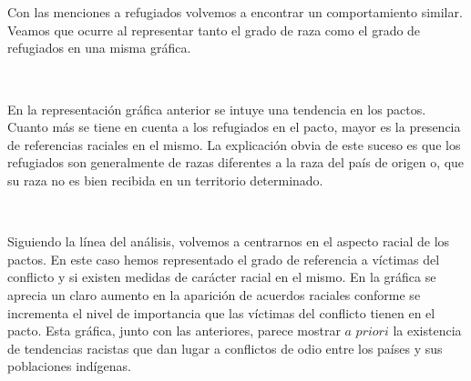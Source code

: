 \documentclass[11pt]{article}
\begin{document}
    \begin{center}
    \end{center}
    { \hspace*{\fill} \\}
    
    \begin{center}
    \end{center}
    { \hspace*{\fill} \\}
    
    Con las menciones a refugiados volvemos a encontrar un comportamiento similar. Veamos que ocurre al representar tanto el grado de raza como el grado de refugiados en una misma gráfica.
        
    \begin{center}
    \end{center}
    { \hspace*{\fill} \\}
    
    En la representación gráfica anterior se intuye una tendencia en los pactos. Cuanto más se tiene en cuenta a los refugiados en el pacto, mayor es la presencia de referencias raciales en el mismo. La explicación obvia de este suceso es que los refugiados son generalmente de razas diferentes a la raza del país de origen o, que su raza no es bien recibida en un territorio determinado.
    
    \begin{center}
    \end{center}
    { \hspace*{\fill} \\}
    
    Siguiendo la línea del análisis, volvemos a centrarnos en el aspecto racial de los pactos. En este caso hemos representado el grado de referencia a víctimas del conflicto y si existen medidas de carácter racial en el mismo. En la gráfica se aprecia un claro aumento en la aparición de acuerdos raciales conforme se incrementa el nivel de importancia que las víctimas del conflicto tienen en el pacto. Esta gráfica, junto con las anteriores, parece mostrar $\textit{a priori}$ la existencia de tendencias racistas que dan lugar a conflictos de odio entre los países y sus poblaciones indígenas.
    
\end{document}
